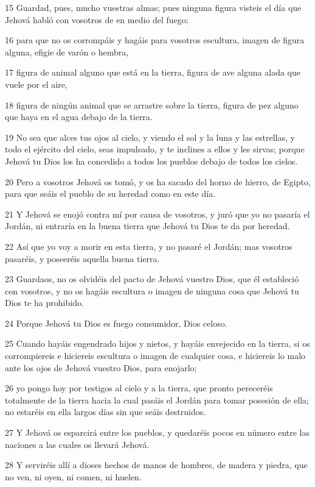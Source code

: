 \par 15 Guardad, pues, mucho vuestras almas; pues ninguna figura visteis el día que Jehová habló con vosotros de en medio del fuego;
\par 16 para que no os corrompáis y hagáis para vosotros escultura, imagen de figura alguna, efigie de varón o hembra,
\par 17 figura de animal alguno que está en la tierra, figura de ave alguna alada que vuele por el aire,
\par 18 figura de ningún animal que se arrastre sobre la tierra, figura de pez alguno que haya en el agua debajo de la tierra.
\par 19 No sea que alces tus ojos al cielo, y viendo el sol y la luna y las estrellas, y todo el ejército del cielo, seas impulsado, y te inclines a ellos y les sirvas; porque Jehová tu Dios los ha concedido a todos los pueblos debajo de todos los cielos.
\par 20 Pero a vosotros Jehová os tomó, y os ha sacado del horno de hierro, de Egipto, para que seáis el pueblo de su heredad como en este día.
\par 21 Y Jehová se enojó contra mí por causa de vosotros, y juró que yo no pasaría el Jordán, ni entraría en la buena tierra que Jehová tu Dios te da por heredad.
\par 22 Así que yo voy a morir en esta tierra, y no pasaré el Jordán; mas vosotros pasaréis, y poseeréis aquella buena tierra.
\par 23 Guardaos, no os olvidéis del pacto de Jehová vuestro Dios, que él estableció con vosotros, y no os hagáis escultura o imagen de ninguna cosa que Jehová tu Dios te ha prohibido.
\par 24 Porque Jehová tu Dios es fuego consumidor, Dios celoso.
\par 25 Cuando hayáis engendrado hijos y nietos, y hayáis envejecido en la tierra, si os corrompiereis e hiciereis escultura o imagen de cualquier cosa, e hiciereis lo malo ante los ojos de Jehová vuestro Dios, para enojarlo;
\par 26 yo pongo hoy por testigos al cielo y a la tierra, que pronto pereceréis totalmente de la tierra hacia la cual pasáis el Jordán para tomar posesión de ella; no estaréis en ella largos días sin que seáis destruidos.
\par 27 Y Jehová os esparcirá entre los pueblos, y quedaréis pocos en número entre las naciones a las cuales os llevará Jehová.
\par 28 Y serviréis allí a dioses hechos de manos de hombres, de madera y piedra, que no ven, ni oyen, ni comen, ni huelen.
